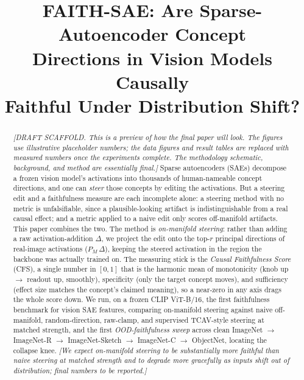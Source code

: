 \documentclass[conference]{IEEEtran}
\newcommand{\pending}[1]{\textcolor{pendingcolor}{\textit{[#1]}}}
\begin{document}
\title{FAITH-SAE: Are Sparse-Autoencoder Concept\\ Directions in Vision Models Causally\\ Faithful Under Distribution Shift?}

\author{
\IEEEauthorblockA{}
}

\maketitle

\begin{abstract}
\pending{DRAFT SCAFFOLD. This is a preview of how the final paper will look. The figures use illustrative placeholder numbers; the data figures and result tables are replaced with measured numbers once the experiments complete. The methodology schematic, background, and method are essentially final.}
Sparse autoencoders (SAEs) decompose a frozen vision model's activations into thousands of human-nameable concept directions, and one can \emph{steer} those concepts by editing the activations. But a steering edit and a faithfulness measure are each incomplete alone: a steering method with no metric is unfalsifiable, since a plausible-looking artifact is indistinguishable from a real causal effect; and a metric applied to a naive edit only scores off-manifold artifacts. This paper combines the two. The method is \emph{on-manifold steering}: rather than adding a raw activation-addition $\Delta$, we project the edit onto the top-$r$ principal directions of real-image activations ($P_M\,\Delta$), keeping the steered activation in the region the backbone was actually trained on. The measuring stick is the \emph{Causal Faithfulness Score} (CFS), a single number in $[0,1]$ that is the harmonic mean of monotonicity (knob up $\rightarrow$ readout up, smoothly), specificity (only the target concept moves), and sufficiency (effect size matches the concept's claimed meaning), so a near-zero in any axis drags the whole score down. We run, on a frozen CLIP ViT-B/16, the first faithfulness benchmark for vision SAE features, comparing on-manifold steering against naive off-manifold, random-direction, raw-clamp, and supervised TCAV-style steering at matched strength, and the first \emph{OOD-faithfulness sweep} across clean ImageNet $\rightarrow$ ImageNet-R $\rightarrow$ ImageNet-Sketch $\rightarrow$ ImageNet-C $\rightarrow$ ObjectNet, locating the collapse knee. \pending{We expect on-manifold steering to be substantially more faithful than naive steering at matched strength and to degrade more gracefully as inputs shift out of distribution; final numbers to be reported.}
\end{abstract}
\end{document}
